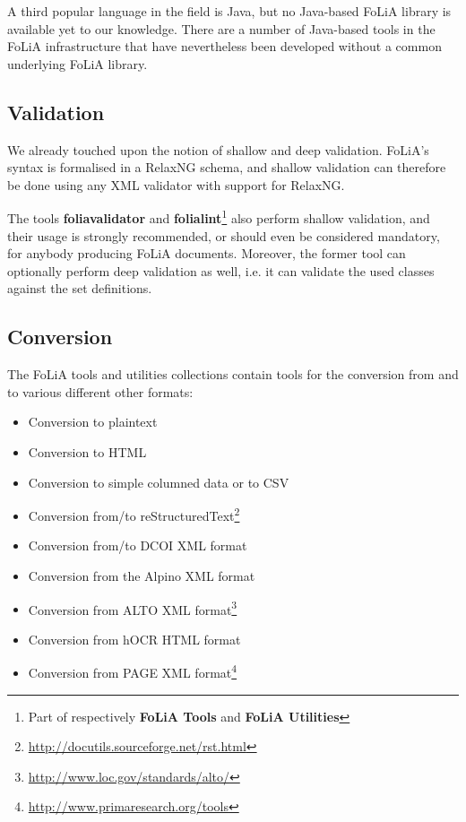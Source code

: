 \documentclass[a4paper,11pt]{article}
\begin{document}
A third popular language in the field is Java, but no Java-based FoLiA
library is available yet to our knowledge. There are a number of
Java-based tools in the FoLiA infrastructure that have nevertheless been developed
without a common underlying FoLiA library.

\subsection{Validation}

We already touched upon the notion of shallow and deep validation.
FoLiA's syntax is formalised in a RelaxNG schema, and shallow validation can
therefore be done using any XML validator with support for RelaxNG.

The tools \textbf{foliavalidator} and \textbf{folialint}\footnote{Part of
respectively \textbf{FoLiA Tools} and \textbf{FoLiA Utilities}} also perform shallow validation, and
their usage is strongly recommended, or should even be considered mandatory,
for anybody producing FoLiA documents. Moreover, the former tool can optionally perform
deep validation as well, i.e. it can validate the used classes against the set
definitions.

\subsection{Conversion}

The FoLiA tools and utilities collections contain tools for the conversion from and to
various different other formats:

\begin{itemize}
    \item Conversion to plaintext
    \item Conversion to HTML
    \item Conversion to simple columned data or to CSV
    \item Conversion from/to reStructuredText\footnote{\url{http://docutils.sourceforge.net/rst.html}}
    \item Conversion from/to DCOI XML format \cite{DCOI}
    \item Conversion from the Alpino XML format \cite{ALPINO}
    \item Conversion from ALTO XML format\footnote{\url{http://www.loc.gov/standards/alto/}}
    \item Conversion from hOCR HTML format  \cite{Breuel2007}
    \item Conversion from PAGE XML format\footnote{\url{http://www.primaresearch.org/tools}}
\end{itemize}
\end{document}
